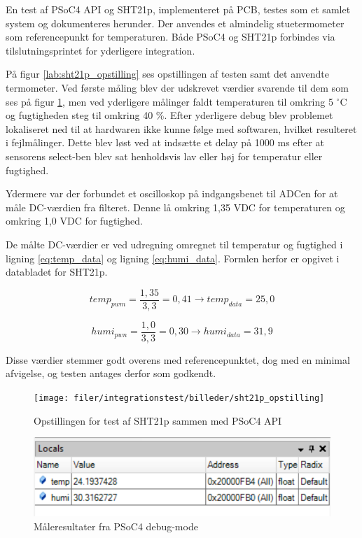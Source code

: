 
En test af PSoC4 API og SHT21p, implementeret på PCB, testes som et samlet system og dokumenteres herunder.
Der anvendes et almindelig stuetermometer som referencepunkt for temperaturen. Både PSoC4 og SHT21p forbindes via tilslutningsprintet for yderligere integration.

På figur \ref{lab:sht21p_opstilling} ses opstillingen af testen samt det anvendte termometer.
Ved første måling blev der udskrevet værdier svarende til dem som ses på figur \ref{lab:sht21p_test_resultat}, men ved yderligere målinger faldt temperaturen til omkring 5 ${^{\circ}}$C og fugtigheden steg til omkring 40 \%. 
Efter yderligere debug blev problemet lokaliseret ned til at hardwaren ikke kunne følge med softwaren, hvilket resulteret i fejlmålinger. Dette blev løst ved at indsætte et delay på 1000 ms efter at sensorens select-ben blev sat henholdsvis lav eller høj for temperatur eller fugtighed.

Ydermere var der forbundet et oscilloskop på indgangsbenet til ADCen for at måle DC-værdien fra filteret. Denne lå omkring 1,35 VDC for temperaturen og omkring 1,0 VDC for fugtighed.  


De målte DC-værdier er ved udregning omregnet til temperatur og fugtighed i ligning \ref{eq:temp_data} og ligning \ref{eq:humi_data}. Formlen herfor er opgivet i databladet for SHT21p.

\begin{equation}
temp_{pwm} = \frac{1,35}{3,3} = 0,41 
\rightarrow temp_{data} = 25,0
\label{eq:temp_data}
\end{equation}

\begin{equation}
humi_{pwn} = \frac{1,0}{3,3} = 0,30 
\rightarrow humi_{data} = 31,9
\label{eq:humi_data}
\end{equation}

Disse værdier stemmer godt overens med referencepunktet, dog med en minimal afvigelse, og testen antages derfor som godkendt. 

\begin{figure}[htb]
  \begin{minipage}{0.48\textwidth}
    \centering
      \texttt{[image: filer/integrationstest/billeder/sht21p\_opstilling]}
      \caption{Opstillingen for test af SHT21p sammen med PSoC4 API}
    \label{lab:sht21p_opstilling}
  \end{minipage}
  \hspace{0.1\textwidth}
  \begin{minipage}{0.48\textwidth}
    \centering
      \includegraphics[width=\textwidth]{filer/integrationstest/billeder/sht21p_test_resultat}
      \caption{Måleresultater fra PSoC4 debug-mode}
    \label{lab:sht21p_test_resultat}
  \end{minipage}
\end{figure}


